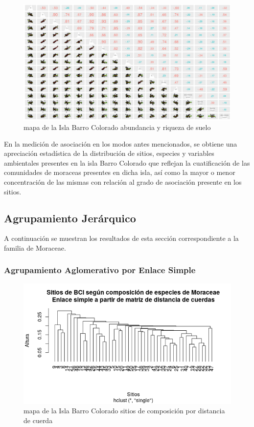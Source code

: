 \documentclass[11pt,]{article}
\begin{document}
\begin{figure}
\centering
\includegraphics[width=1.00000\textwidth]{matriz_correlacion_suelo_abun_riq_spearman.png}
\caption{mapa de la Isla Barro Colorado abundancia y riqueza de suelo
\label{fig:bci_map}}
\end{figure}

En la medición de asociación en los modos antes mencionados, se obtiene
una apreciación estadística de la distribución de sitios, especies y
variables ambientales presentes en la isla Barro Colorado que reflejan
la cuatificación de las comunidades de moraceas presentes en dicha isla,
así como la mayor o menor concentración de las mismas con relación al
grado de asociación presente en los sitios.

\subsection{Agrupamiento Jerárquico}\label{agrupamiento-jeruxe1rquico}

A continuación se muestran los resultados de esta sección
correspondiente a la familia de Moraceae.

\subsubsection{Agrupamiento Aglomerativo por Enlace
Simple}\label{agrupamiento-aglomerativo-por-enlace-simple}

\begin{figure}
\centering
\includegraphics[width=1.00000\textwidth]{sitios_composicion_distancia_cuerdas.png}
\caption{mapa de la Isla Barro Colorado sitios de composición por
distancia de cuerda \label{fig:bci_map}}
\end{figure}
\end{document}
